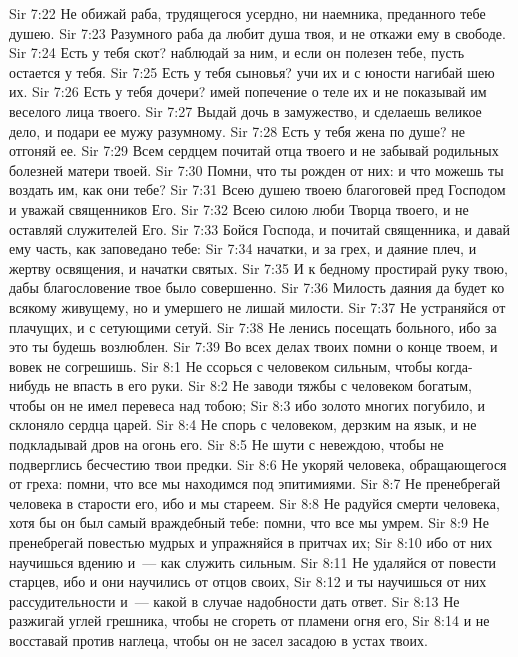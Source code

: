 \vs Sir 7:22 Не обижай раба, трудящегося усердно, ни наемника, преданного тебе душею.
\vs Sir 7:23 Разумного раба да любит душа твоя, и не откажи ему в свободе.
\vs Sir 7:24 Есть у тебя скот? наблюдай за ним, и если он полезен тебе, пусть остается у тебя.
\vs Sir 7:25 Есть у тебя сыновья? учи их и с юности нагибай шею их.
\vs Sir 7:26 Есть у тебя дочери? имей попечение о теле их и не показывай им веселого лица твоего.
\vs Sir 7:27 Выдай дочь в замужество, и сделаешь великое дело, и подари ее мужу разумному.
\vs Sir 7:28 Есть у тебя жена по душе? не отгоняй ее.
\vs Sir 7:29 Всем сердцем почитай отца твоего и не забывай родильных болезней матери твоей.
\vs Sir 7:30 Помни, что ты рожден от них: и что можешь ты воздать им, как они тебе?
\vs Sir 7:31 Всею душею твоею благоговей пред Господом и уважай священников Его.
\vs Sir 7:32 Всею силою люби Творца твоего, и не оставляй служителей Его.
\vs Sir 7:33 Бойся Господа, и почитай священника, и давай ему часть, как заповедано тебе:
\vs Sir 7:34 начатки, и за грех, и даяние плеч, и жертву освящения, и начатки святых.
\vs Sir 7:35 И к бедному простирай руку твою, дабы благословение твое было совершенно.
\vs Sir 7:36 Милость даяния да будет ко всякому живущему, но и умершего не лишай милости.
\vs Sir 7:37 Не устраняйся от плачущих, и с сетующими сетуй.
\vs Sir 7:38 Не ленись посещать больного, ибо за это ты будешь возлюблен.
\vs Sir 7:39 Во всех делах твоих помни о конце твоем, и вовек не согрешишь.
\vs Sir 8:1 Не ссорься с человеком сильным, чтобы когда-нибудь не впасть в его руки.
\vs Sir 8:2 Не заводи тяжбы с человеком богатым, чтобы он не имел перевеса над тобою;
\vs Sir 8:3 ибо золото многих погубило, и склоняло сердца царей.
\vs Sir 8:4 Не спорь с человеком, дерзким на язык, и не подкладывай дров на огонь его.
\vs Sir 8:5 Не шути с невеждою, чтобы не подверглись бесчестию твои предки.
\vs Sir 8:6 Не укоряй человека, обращающегося от греха: помни, что все мы находимся под эпитимиями.
\vs Sir 8:7 Не пренебрегай человека в старости его, ибо и мы стареем.
\vs Sir 8:8 Не радуйся смерти человека, хотя бы он был самый враждебный тебе: помни, что все мы умрем.
\vs Sir 8:9 Не пренебрегай повестью мудрых и упражняйся в притчах их;
\vs Sir 8:10 ибо от них научишься вдению и~--- как служить сильным.
\vs Sir 8:11 Не удаляйся от повести старцев, ибо и они научились от отцов своих,
\vs Sir 8:12 и ты научишься от них рассудительности и~--- какой в случае надобности дать ответ.
\vs Sir 8:13 Не разжигай углей грешника, чтобы не сгореть от пламени огня его,
\vs Sir 8:14 и не восставай против наглеца, чтобы он не засел засадою в устах твоих.
